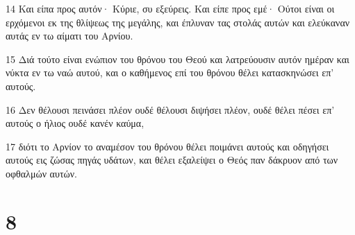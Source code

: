 \par 14 Και είπα προς αυτόν· Κύριε, συ εξεύρεις. Και είπε προς εμέ· Ούτοι είναι οι ερχόμενοι εκ της θλίψεως της μεγάλης, και έπλυναν τας στολάς αυτών και ελεύκαναν αυτάς εν τω αίματι του Αρνίου.
\par 15 Διά τούτο είναι ενώπιον του θρόνου του Θεού και λατρεύουσιν αυτόν ημέραν και νύκτα εν τω ναώ αυτού, και ο καθήμενος επί του θρόνου θέλει κατασκηνώσει επ' αυτούς.
\par 16 Δεν θέλουσι πεινάσει πλέον ουδέ θέλουσι διψήσει πλέον, ουδέ θέλει πέσει επ' αυτούς ο ήλιος ουδέ κανέν καύμα,
\par 17 διότι το Αρνίον το αναμέσον του θρόνου θέλει ποιμάνει αυτούς και οδηγήσει αυτούς εις ζώσας πηγάς υδάτων, και θέλει εξαλείψει ο Θεός παν δάκρυον από των οφθαλμών αυτών.

\chapter{8}

